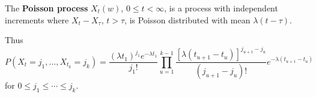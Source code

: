The \textbf{Poisson process} $X_t(w)$, $0 \leq t < \infty$, is a process with independent increments where $X_t - X_\tau$, $t > \tau$, is Poisson distributed with mean $\lambda(t - \tau)$.

Thus
$$P(X_t = j_1, \ldots, X_{t_k} = j_k) = \frac{(\lambda t_1)^{j_1} e^{-\lambda t_1}}{j_1!} \prod_{u=1}^{k-1} \frac{[\lambda(t_{u+1} - t_u)]^{j_{u+1} - j_u}}{(j_{u+1} - j_u)!} e^{-\lambda(t_{u+1} - t_u)}$$
for $0 \leq j_1 \leq \cdots \leq j_k$.
